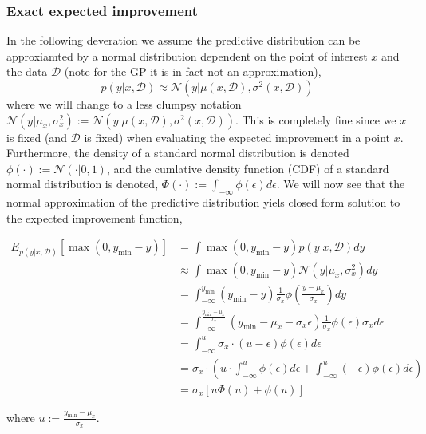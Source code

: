 \subsubsection{Exact expected improvement}
In the following deveration
we assume the predictive distribution can be approxiamted by a normal distribution dependent on
the point of interest $x$ and the data $\mathcal{D}$ (note for the GP
it is in fact not an approximation), 
$$p(y|x,\mathcal{D}) \approx \mathcal{N}(y|\mu(x,\mathcal{D}), \sigma^2(x,\mathcal{D}))$$ where we
will change to a less clumpsy notation $\mathcal{N}(y|\mu_x,
\sigma^2_x):=\mathcal{N}(y|\mu(x,\mathcal{D}), \sigma^2(x,\mathcal{D}))$. This is completely fine
since we $x$ is fixed (and $\mathcal{D}$ is fixed) when evaluating the expected improvement in a point
$x$. %
Furthermore, the density of
a standard normal distribution is denoted $\phi(\cdot):=\mathcal{N}(\cdot | 0,1)$, and the cumlative
density function (CDF) of a standard normal distribution is denoted, $\Phi(\cdot) :=
\int_{-\infty}^{\cdot} \phi(\epsilon)d\epsilon$. We will now see that the normal approximation
of the predictive distribution yiels closed form solution to the expected improvement function, 

\begin{align*}
    E_{p(y|x,\mathcal{D})}[\max(0,y_{\min}-y)] &= \int \max(0,y_{\min}-y) p(y|x,\mathcal{D}) dy\\
    &\approx \int \max(0,y_{\min}-y) \mathcal{N}(y|\mu_x, \sigma_x^2) dy\\
    &= \int_{-\infty}^{y_{\min}} (y_{\min}-y) \frac{1}{\sigma_x}\phi\left(\frac{y-\mu_x}{\sigma_x}\right) dy\\
    &= \int_{-\infty}^{\frac{y_{\min}-\mu_x}{\sigma_x}} (y_{\min}-\mu_x-\sigma_x\epsilon) \frac{1}{\sigma_x}\phi\left(\epsilon\right) \sigma_x d\epsilon\\
    &= \int_{-\infty}^u \sigma_x \cdot (u-\epsilon) \phi(\epsilon) d\epsilon\\
    &=  \sigma_x \cdot \left( u\cdot \int_{-\infty}^u \phi(\epsilon) d\epsilon +\int_{-\infty}^u (-\epsilon)  \phi(\epsilon) d\epsilon \right) \\
    &= \sigma_x [u\Phi(u)+ \phi(u)]
\end{align*}

where $u:=\frac{y_{\min}-\mu_x}{\sigma_x}$. 

